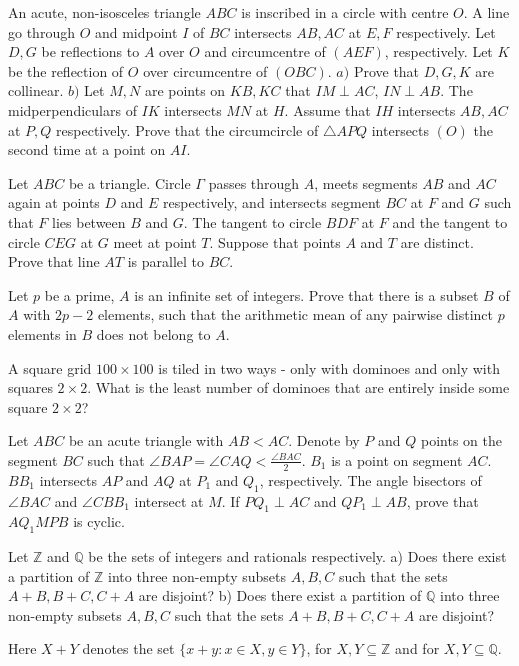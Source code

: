 \documentclass[11pt]{scrartcl}
\begin{document}
\begin{problem}[796349431725149]
An acute, non-isosceles triangle $ABC$ is inscribed in a circle with centre $O$. A line go through $O$ and midpoint $I$ of $BC$ intersects $AB, AC$ at $E, F$ respectively. Let $D, G$ be reflections to $A$ over $O$ and circumcentre of $(AEF)$, respectively. Let $K$ be the reflection of $O$ over circumcentre of $(OBC)$.
$a)$ Prove that $D, G, K$ are collinear.
$b)$ Let $M, N$ are points on $KB, KC$ that $IM\perp AC$, $IN\perp AB$. The midperpendiculars of $IK$ intersects $MN$ at $H$. Assume that $IH$ intersects $AB, AC$ at $P, Q$ respectively. Prove that the circumcircle of $\triangle APQ$ intersects $(O)$ the second time at a point on $AI$.
\end{problem}
\begin{problem}[797215984506934]
	Let $ABC$ be a triangle. Circle $\Gamma$ passes through $A$, meets segments $AB$ and $AC$ again at points $D$ and $E$ respectively, and intersects segment $BC$ at $F$ and $G$ such that $F$ lies between $B$ and $G$. The tangent to circle $BDF$ at $F$ and the tangent to circle $CEG$ at $G$ meet at point $T$. Suppose that points $A$ and $T$ are distinct. Prove that line $AT$ is parallel to $BC$.
\end{problem}
\begin{problem}[799244327993888]
Let $p$ be a prime, $A$ is an infinite set of integers. Prove that there is a subset $B$ of $A$ with $2p-2$ elements, such that the arithmetic mean of any pairwise distinct $p$ elements in $B$ does not belong to $A$.
\end{problem}
\begin{problem}[799773800583372]
	A square grid $100 \times 100$ is tiled in two ways - only with dominoes and only with squares $2 \times 2$. What is the least number of dominoes that are entirely inside some square $2 \times 2$?
\end{problem}
\begin{problem}[806540218855542]
Let $ABC$ be an acute triangle with $AB< AC$. Denote by $P$ and $Q$ points on the segment $BC$ such that $\angle BAP = \angle CAQ < \frac{\angle BAC}{2}$. $B_1$ is a point on segment $AC$. $BB_1$ intersects $AP$ and $AQ$ at $P_1$ and $Q_1$, respectively. The angle bisectors of $\angle BAC$ and $\angle CBB_1$ intersect at $M$. If $PQ_1\perp AC$ and $QP_1\perp AB$, prove that $AQ_1MPB$ is cyclic.
\end{problem}
\begin{problem}[810041368501810]
Let $\mathbb{Z}$ and $\mathbb{Q}$ be the sets of integers and rationals respectively.
a) Does there exist a partition of $\mathbb{Z}$ into three non-empty subsets $A,B,C$ such that the sets $A+B, B+C, C+A$ are disjoint?
b) Does there exist a partition of $\mathbb{Q}$ into three non-empty subsets $A,B,C$ such that the sets $A+B, B+C, C+A$ are disjoint?

Here $X+Y$ denotes the set $\{ x+y : x \in X, y \in Y \}$, for $X,Y \subseteq \mathbb{Z}$ and for $X,Y \subseteq \mathbb{Q}$.
\end{problem}
\end{document}
